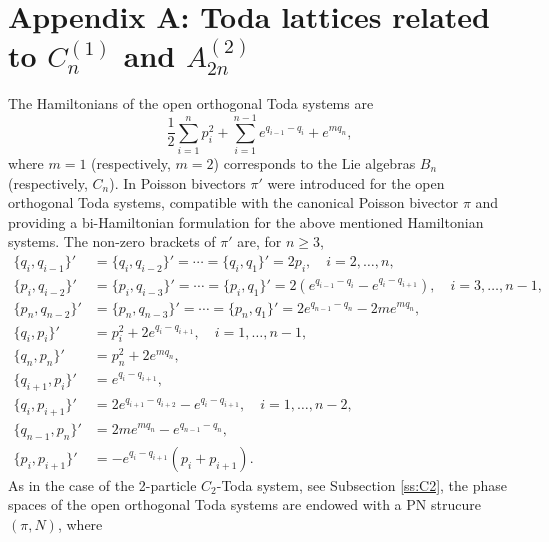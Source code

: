\documentclass[12pt]{article}
\begin{document}
\section*{Appendix A: Toda lattices related to $C_n^{(1)}$ and $A_{2n}^{(2)}$}
\label{app:Cn}
The Hamiltonians of the open orthogonal Toda systems %
are 
\begin{equation}\label{eq: Hamiltonian B & C}
\frac{1}{2}\sum_{i=1}^np_i^2+\sum_{i=1}^{n-1}e^{q_{i-1}-q_i}+e^{mq_n},   
\end{equation}
where $m=1$ (respectively, $m=2$) corresponds to the Lie algebras $B_n$ (respectively, $C_n$). 
In \cite{daCosta-Damianou} Poisson bivectors $%
{\pi'}$ were introduced for the open orthogonal Toda systems, compatible with the canonical Poisson bivector 
$\pi$ and providing a bi-Hamiltonian formulation for the above mentioned Hamiltonian systems. 
The non-zero brackets %
of $%
{\pi'}$ are, for $n\ge 3$, 
\begin{equation}\label{eq: B_n & C_n brackets}
\begin{aligned}
\lbrace q_i,q_{i-1}\rbrace'&=\lbrace q_i,q_{i-2}\rbrace'=\cdots=\lbrace q_i,q_1\rbrace'=2p_i,\quad i=2,\ldots,n,\\
\lbrace p_i,q_{i-2}\rbrace'&=\lbrace p_i,q_{i-3}\rbrace'=\cdots=\lbrace p_i,q_1\rbrace'=2\left(e^{q_{i-1}-q_i}-e^{q_i-q_{i+1}}\right),\quad i=3,\ldots,n-1,\\
\lbrace p_n,q_{n-2}\rbrace'&=\lbrace p_n,q_{n-3}\rbrace'=\cdots=\lbrace p_n,q_1\rbrace'=2e^{q_{n-1}-q_n}-2me^{mq_n},\\
\lbrace q_i,p_i\rbrace'&=p_i^2+2e^{q_i-q_{i+1}},\quad i=1,\ldots,n-1,\\
\lbrace q_n,p_n\rbrace'&=p_n^2+2e^{mq_n},\\
\lbrace q_{i+1},p_i\rbrace'&=e^{q_i-q_{i+1}},\\
\lbrace q_i,p_{i+1}\rbrace'&=2e^{q_{i+1}-q_{i+2}}-e^{q_i-q_{i+1}},\quad i=1,\ldots,n-2,\\
\lbrace q_{n-1},p_n\rbrace'&=2me^{mq_n}-e^{q_{n-1}-q_n},\\
\lbrace p_i,p_{i+1}\rbrace'&=-e^{q_i-q_{i+1}}(p_i+p_{i+1}).
\end{aligned}
\end{equation}
 As in the case of the 2-particle $C_2$-Toda system, see Subsection \ref{ss:C2},
 the phase spaces of the open orthogonal Toda systems are endowed with a PN strucure $(\pi,N)$, where %
\end{document}
